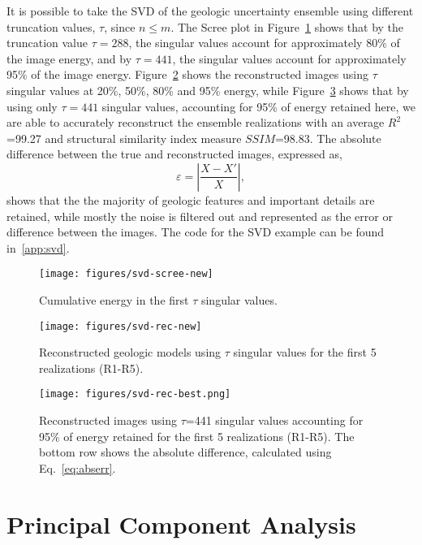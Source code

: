 \documentclass[a4paper,fleqn,12pt]{article}
\begin{document}
It is possible to take the SVD of the geologic uncertainty ensemble using different truncation values, $\tau$, since $n\leq m$. The Scree plot in Figure~\ref{fig:svd-scree} shows that by the truncation value $\tau=288$, the singular values account for approximately 80\% of the image energy, and by $\tau=441$, the singular values account for approximately 95\% of the image energy. Figure~\ref{fig:svd-rec} shows the reconstructed images using $\tau$ singular values at 20\%, 50\%, 80\% and 95\% energy, while Figure~\ref{fig:svd-rec-best} shows that by using only $\tau=441$ singular values, accounting for 95\% of energy retained here, we are able to accurately reconstruct the ensemble realizations with an average $R^2$=99.27 and structural similarity index measure $SSIM$=98.83. The absolute difference between the true and reconstructed images, expressed as,
\begin{equation}\label{eq:abserr}
    \varepsilon = |\frac{X-X'}{X}| ,
\end{equation}
shows that the the majority of geologic features and important details are retained, while mostly the noise is filtered out and represented as the error or difference between the images. The code for the SVD example can be found in~\ref{app:svd}.

\begin{figure}[H]
    \centering
    \texttt{[image: figures/svd-scree-new]}
    \caption{Cumulative energy in the first $\tau$ singular values.}
    \label{fig:svd-scree}
\end{figure}

\begin{figure}[H]
    \centering
    \texttt{[image: figures/svd-rec-new]}
    \caption{Reconstructed geologic models using $\tau$ singular values for the first 5 realizations (R1-R5).}
    \label{fig:svd-rec}
\end{figure}

\begin{figure}[H]
    \centering
    \texttt{[image: figures/svd-rec-best.png]}
    \caption{Reconstructed images using $\tau$=441 singular values accounting for 95\% of energy retained for the first 5 realizations (R1-R5). The bottom row shows the absolute difference, calculated using Eq.~\ref{eq:abserr}.}
    \label{fig:svd-rec-best}
\end{figure}

\pagebreak
\section*{Principal Component Analysis}
\end{document}
